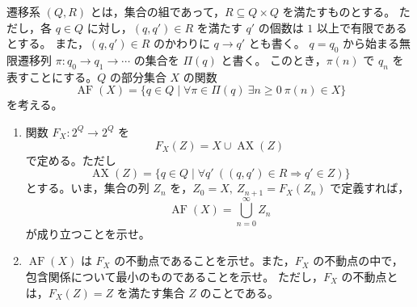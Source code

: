 \documentclass[12pt]{jlreq}
\newcommand{\AF}{\operatorname{AF}}
\newcommand{\AX}{\operatorname{AX}}
\begin{document}
遷移系 \((Q,R)\) とは，集合の組であって，\(R\subseteq Q\times Q\) を満たすものとする。
ただし，各 \(q\in Q\) に対し，\((q,q')\in R\) を満たす \(q'\) の個数は \(1\) 以上で有限であるとする。
また，\((q,q')\in R\) のかわりに \(q\to q'\) とも書く。
\(q=q_0\) から始まる無限遷移列 \(\pi:q_0\to q_1\to\cdots\) の集合を \(\Pi(q)\) と書く。
このとき，\(\pi(n)\) で \(q_n\) を表すことにする。\(Q\) の部分集合 \(X\) の関数
\[
  \AF(X)=\{q\in Q\mid \forall \pi\in\Pi(q)\ \exists n\ge0\ \pi(n)\in X\}
\]
を考える。

\begin{enumerate}
  \item 関数 \(F_X:2^Q\to 2^Q\) を
  \[
    F_X(Z)=X\cup \AX(Z)
  \]
  で定める。ただし
  \[
    \AX(Z)=\{q\in Q\mid \forall q'\ ((q,q')\in R\Rightarrow q'\in Z)\}
  \]
  とする。いま，集合の列 \(Z_n\) を，\(Z_0=X,\ Z_{n+1}=F_X(Z_n)\) で定義すれば，
  \[
    \AF(X)=\bigcup_{n=0}^{\infty}Z_n
  \]
  が成り立つことを示せ。
  \item \(\AF(X)\) は \(F_X\) の不動点であることを示せ。また，\(F_X\) の不動点の中で，包含関係について最小のものであることを示せ。
  ただし，\(F_X\) の不動点とは，\(F_X(Z)=Z\) を満たす集合 \(Z\) のことである。
\end{enumerate}
\end{document}

